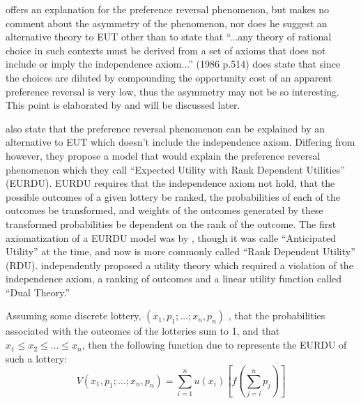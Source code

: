 \documentclass[../main.tex]{subfiles}
\begin{document}
\textcite{Holt1986} offers an explanation for the preference reversal phenomenon, but makes no comment about the asymmetry of the phenomenon, nor does he suggest an alternative theory to EUT other than to state that \enquote{...any theory of rational choice in such contexts must be derived from a set of axioms that does not include or imply the independence axiom...} (1986 p.514) \textcite{Holt1986} does state that since the choices are diluted by compounding the opportunity cost of an apparent preference reversal is very low, thus the asymmetry may not be so interesting.
This point is elaborated by \textcite{Harrison1989, Harrison1992} and will be discussed later.

\textcite{Karni1987} also state that the preference reversal phenomenon can be explained by an alternative to EUT which doesn't include the independence axiom.
Differing from \textcite{Holt1986} however, they propose a model that would explain the preference reversal phenomenon which they call \enquote{Expected Utility with Rank Dependent Utilities} (EURDU).
EURDU requires that  the independence axiom not hold, that the possible outcomes of a given lottery be ranked, the probabilities of each of the outcomes be transformed, and weights of the outcomes generated by these transformed probabilities be dependent on the rank of the outcome.
The first axiomatization of a EURDU model was by \textcite{Quiggin1982}, though it was calle \enquote{Anticipated Utility} at the time, and now is more commonly called \enquote{Rank Dependent Utility} (RDU).
\textcite{Yaari1987} independently proposed a utility theory which required a violation of the independence axiom, a ranking of outcomes and a linear utility function called \enquote{Dual Theory.}

Assuming some discrete lottery, $(x_1,p_1;\ldots;x_n,p_n)$ , that the probabilities associated with the outcomes of the lotteries sum to 1, and that $x_1 \leq x_2 \leq \ldots \leq x_n$, then the following function due to \textcite{Karni1987} represents the EURDU of such a lottery:
\begin{equation}
	\label{eq:KS1987-EURDU}
	V(x_1,p_1; \ldots ; x_n, p_n) = \sum_{i=1}^{n}u(x_i) \left[ f\left( \sum_{j=i}^n p_j\right)  \right]
\end{equation}
\end{document}
